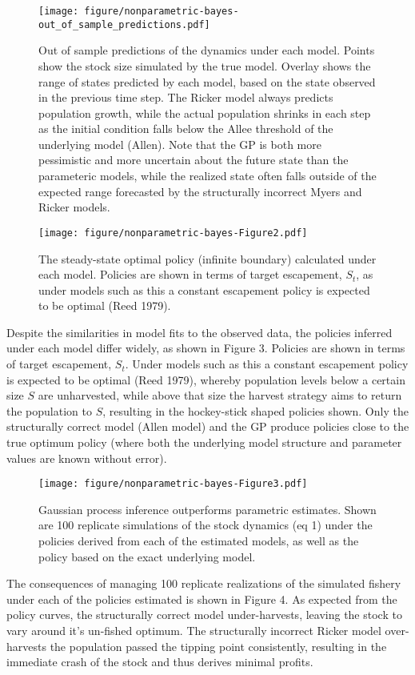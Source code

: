 \documentclass[author-year, review]{elsarticle} %
\makeatletter
\def\maxwidth{\ifdim\Gin@nat@width>\linewidth\linewidth
\else\Gin@nat@width\fi}
\let\Oldincludegraphics\includegraphics
\renewcommand{\includegraphics}[1]{\Oldincludegraphics[width=\maxwidth]{#1}}
\makeatother
\begin{document}
\begin{figure}[htbp]
\centering
\texttt{[image: figure/nonparametric-bayes-out\_of\_sample\_predictions.pdf]}
\caption{Out of sample predictions of the dynamics under each model.
Points show the stock size simulated by the true model. Overlay shows
the range of states predicted by each model, based on the state observed
in the previous time step. The Ricker model always predicts population
growth, while the actual population shrinks in each step as the initial
condition falls below the Allee threshold of the underlying model
(Allen). Note that the GP is both more pessimistic and more uncertain
about the future state than the parameteric models, while the realized
state often falls outside of the expected range forecasted by the
structurally incorrect Myers and Ricker models.}
\end{figure}

\begin{figure}[htbp]
\centering
\texttt{[image: figure/nonparametric-bayes-Figure2.pdf]}
\caption{The steady-state optimal policy (infinite boundary) calculated
under each model. Policies are shown in terms of target escapement,
$S_t$, as under models such as this a constant escapement policy is
expected to be optimal (Reed 1979).}
\end{figure}

Despite the similarities in model fits to the observed data, the
policies inferred under each model differ widely, as shown in Figure 3.
Policies are shown in terms of target escapement, $S_t$. Under models
such as this a constant escapement policy is expected to be optimal
(Reed 1979), whereby population levels below a certain size $S$ are
unharvested, while above that size the harvest strategy aims to return
the population to $S$, resulting in the hockey-stick shaped policies
shown. Only the structurally correct model (Allen model) and the GP
produce policies close to the true optimum policy (where both the
underlying model structure and parameter values are known without
error).

\begin{figure}[htbp]
\centering
\texttt{[image: figure/nonparametric-bayes-Figure3.pdf]}
\caption{Gaussian process inference outperforms parametric estimates.
Shown are 100 replicate simulations of the stock dynamics (eq 1) under
the policies derived from each of the estimated models, as well as the
policy based on the exact underlying model.}
\end{figure}

The consequences of managing 100 replicate realizations of the simulated
fishery under each of the policies estimated is shown in Figure 4. As
expected from the policy curves, the structurally correct model
under-harvests, leaving the stock to vary around it's un-fished optimum.
The structurally incorrect Ricker model over-harvests the population
passed the tipping point consistently, resulting in the immediate crash
of the stock and thus derives minimal profits.
\end{document}

